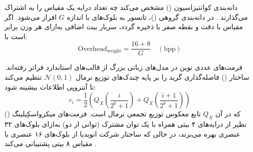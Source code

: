 دانه‌بندی کوانتیزاسیون () مشخص می‌کند چه تعداد درایه یک مقیاس را به اشتراک می‌گذارند \cite{gong2024survey}. در دانه‌بندی گروهی ()، تانسور به بلوک‌های با اندازه $G$ افراز می‌شود. اگر مقیاس با دقت  و نقطه صفر با  ذخیره گردد، سربار بیت اضافی به‌ازای هر وزن برابر است با:
\begin{equation}
    \text{Overhead}_{\text{weight}} = \frac{16 + 8}{G} \quad (\text{bpp})
\end{equation}

فرمت‌های عددی نوین در مدل‌های زبانی بزرگ از قالب‌های استاندارد فراتر رفته‌اند. ساختار  () \cite{dettmers2023qlora} فاصله‌گذاری گرید را بر پایه چندک‌های توزیع نرمال $\mathcal{N}(0, 1)$ تنظیم می‌کند تا آنتروپی اطلاعات بیشینه شود:
\begin{equation}
    c_i = \frac{1}{2} \left( Q_X\left(\frac{i}{2^b + 1}\right) + Q_X\left(\frac{i+1}{2^b + 1}\right) \right)
\end{equation}
که در آن $Q_X$ تابع معکوس توزیع تجمعی نرمال است. فرمت‌های میکرواسکِیلینگ () نظیر  \cite{rouhani2023microscaling} از درایه‌های ۴ بیتی  همراه با یک توان مشترک  (توانی از دو) به‌ازای بلوک‌های ۳۲ عنصری بهره می‌برند، در حالی که ساختار  شرکت انویدیا \cite{nvidia2025nvfp4} از بلوک‌های ۱۶ عنصری با مقیاس ۸ بیتی  پشتیبانی می‌کند \cite{jokar2026transforms, whalen2026kbbq}.

